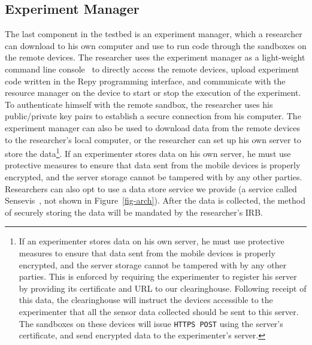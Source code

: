 %




\subsection{Experiment Manager}\label{sec-emt}

The last component in the testbed is an experiment manager, which a 
researcher can download to his own computer and use to run code through 
the sandboxes on the remote devices. 
The researcher uses the experiment manager as a light-weight command line 
console~\cite{demo-kit} to directly access the remote devices, upload 
experiment code written in the Repy programming interface, and
communicate with the resource manager on the device to start 
or stop the execution of the experiment. To authenticate himself with 
the remote sandbox, the researcher uses 
his public/private key pairs to establish a secure connection from his
computer. The experiment manager can also be used to download data 
from the remote devices to the researcher's local computer, or
the researcher can set up his own server to store the data\footnote{\scriptsize
If an experimenter stores data on his own server, he must use protective
measures to ensure that data sent from the mobile devices is
properly encrypted, and the server storage cannot be tampered
with by any other parties. This is enforced by requiring the experimenter to register
his server by providing its certificate and URL to our
clearinghouse. Following receipt of this data, the clearinghouse will instruct the devices
accessible to the experimenter that all the sensor data collected should be
sent to this server. The sandboxes on these devices will issue
\texttt{HTTPS POST} using the server's certificate, and send encrypted
data to the experimenter's server.}. 
If an experimenter stores data on his own server, he must use protective
measures to ensure that data sent from the mobile devices is
properly encrypted, and the server storage cannot be tampered
with by any other parties. Researchers can also opt to use a data 
store service we provide (a service called Sensevis~\cite{sensevis}, 
not shown in Figure~\ref{fig-arch}). After the data is collected, the method of 
securely storing the data will be mandated by the researcher's IRB.


